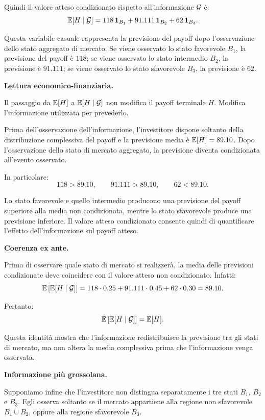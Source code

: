 Quindi il valore atteso condizionato rispetto all'informazione
$\mathcal{G}$ \`{e}:
\[
\mathbb{E}[H\mid\mathcal{G}]
=
118\,\mathbf{1}_{B_1}
+
91.111\,\mathbf{1}_{B_2}
+
62\,\mathbf{1}_{B_3}.
\]

Questa variabile casuale rappresenta la previsione del payoff dopo
l'osservazione dello stato aggregato di mercato. Se viene osservato lo stato
favorevole $B_1$, la previsione del payoff \`{e} $118$; se viene osservato lo
stato intermedio $B_2$, la previsione \`{e} $91.111$; se viene osservato lo
stato sfavorevole $B_3$, la previsione \`{e} $62$.

\medskip

\noindent
\textbf{Lettura economico-finanziaria.}

Il passaggio da $\mathbb{E}[H]$ a $\mathbb{E}[H\mid\mathcal{G}]$ non modifica
il payoff terminale $H$. Modifica l'informazione utilizzata per prevederlo.

Prima dell'osservazione dell'informazione, l'investitore dispone soltanto
della distribuzione complessiva del payoff e la previsione media \`{e}
$\mathbb{E}[H]=89.10$. Dopo l'osservazione dello stato di mercato aggregato,
la previsione diventa condizionata all'evento osservato.

In particolare:
\[
118 > 89.10,
\qquad
91.111 > 89.10,
\qquad
62 < 89.10.
\]

Lo stato favorevole e quello intermedio producono una previsione del payoff
superiore alla media non condizionata, mentre lo stato sfavorevole produce una
previsione inferiore. Il valore atteso condizionato consente quindi di
quantificare l'effetto dell'informazione sul payoff atteso.

\medskip

\noindent
\textbf{Coerenza ex ante.}

Prima di osservare quale stato di mercato si realizzer\`{a}, la media delle
previsioni condizionate deve coincidere con il valore atteso non condizionato.
Infatti:
\[
\mathbb{E}\left[
\mathbb{E}[H\mid\mathcal{G}]
\right]
=
118\cdot0.25
+
91.111\cdot0.45
+
62\cdot0.30
=
89.10.
\]

Pertanto:
\[
\mathbb{E}\left[
\mathbb{E}[H\mid\mathcal{G}]
\right]
=
\mathbb{E}[H].
\]

Questa identit\`{a} mostra che l'informazione redistribuisce la previsione tra
gli stati di mercato, ma non altera la media complessiva prima che
l'informazione venga osservata.

\medskip

\noindent
\textbf{Informazione pi\`{u} grossolana.}

Supponiamo infine che l'investitore non distingua separatamente i tre stati
$B_1$, $B_2$ e $B_3$. Egli osserva soltanto se il mercato appartiene alla
regione non sfavorevole $B_1\cup B_2$, oppure alla regione sfavorevole $B_3$.


